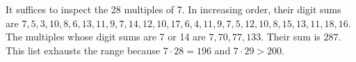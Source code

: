 It suffices to inspect the 28 multiples of 7. In increasing order, their digit sums are $7,5,3,10,8,6,13,11,9,7,14,12,10,17,6,4,11,9,7,5,12,10,8,15,13,11,18,16$. The multiples whose digit sums are 7 or 14 are $7,70,77,133$. Their sum is $\boxed{287}$. This list exhausts the range because $7\cdot28=196$ and $7\cdot29>200$.
